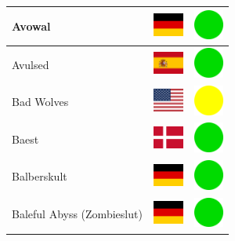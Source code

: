 \documentclass[12pt, a4paper, twoside]{report}
\begin{document}
\begin{center}
\begin{longtable}{|p{5cm}|p{2cm}|p{2cm}|}
 Avowal                                                     & \includegraphics[width=1cm]{4x3/de} &   \includegraphics[width=1cm]{likes/y} \\ \hline
 Avulsed                                                    & \includegraphics[width=1cm]{4x3/es} &   \includegraphics[width=1cm]{likes/y} \\ \hline
 Bad Wolves                                                 & \includegraphics[width=1cm]{4x3/us} &   \includegraphics[width=1cm]{likes/m} \\ \hline
 Baest                                                      & \includegraphics[width=1cm]{4x3/dk} &   \includegraphics[width=1cm]{likes/y} \\ \hline
 Balberskult                                                & \includegraphics[width=1cm]{4x3/de} &   \includegraphics[width=1cm]{likes/y} \\ \hline
 Baleful Abyss (Zombieslut)                                 & \includegraphics[width=1cm]{4x3/de} &   \includegraphics[width=1cm]{likes/y} \\ \hline

\end{longtable}
\end{center}
\end{document}
